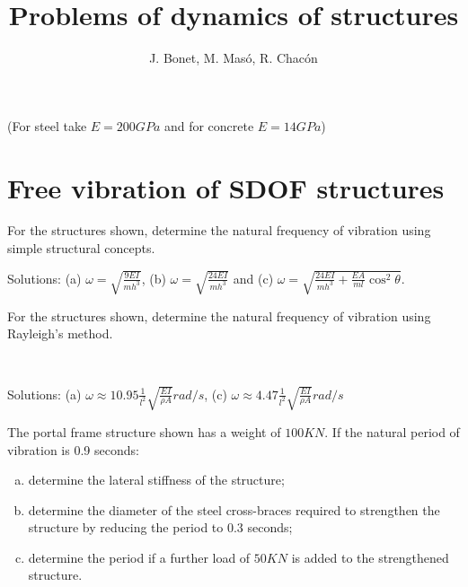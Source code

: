 \documentclass{problems}
\title{Problems of dynamics of structures}
\author{J. Bonet, M. Masó, R. Chacón}
\begin{document}
\maketitle

(For steel take $E=200GPa$ and for concrete $E=14GPa$)

\section{Free vibration of SDOF structures}


For the structures shown, determine the natural frequency of vibration using simple structural concepts.

\begin{center}
    \hspace{2em}
    \hspace{2em}
\end{center}

Solutions: (a) $\omega = \sqrt{\frac{9EI}{mh^3}}$, (b) $\omega = \sqrt{\frac{24EI}{mh^3}}$ and (c) $\omega = \sqrt{\frac{24EI}{mh^3}+\frac{EA}{ml}\cos^2\theta}$.



For the structures shown, determine the natural frequency of vibration using Rayleigh's method.

\begin{center}
     \\
\end{center}

Solutions: (a) $\omega \approx 10.95\frac{1}{l^2}\sqrt{\frac{EI}{\rho A}} rad/s$, (c) $\omega \approx 4.47\frac{1}{l^2}\sqrt{\frac{EI}{\rho A}} rad/s$



The portal frame structure shown has a weight of $100KN$. If the natural period of vibration is 0.9 seconds:
\begin{enumerate}[(a)]
    \item determine the lateral stiffness of the structure;
    \item determine the diameter of the steel cross-braces required to strengthen the structure by reducing the period to 0.3 seconds;
    \item determine the period if a further load of $50KN$ is added to the strengthened structure.
\end{enumerate}
\end{document}

